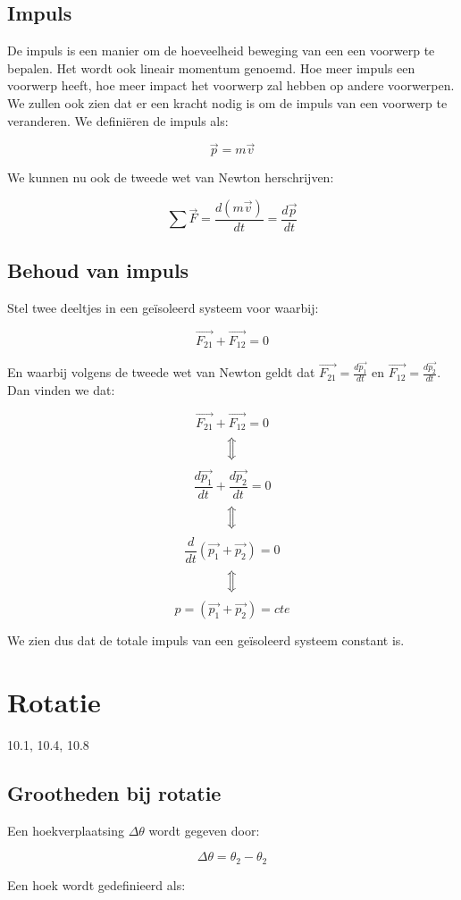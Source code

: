 \documentclass[12pt,a4paper]{article}
\newcommand{\Luda}{\Big\Updownarrow}
\begin{document}
    \subsection{Impuls}
    De impuls is een manier om de hoeveelheid beweging van een een voorwerp te
    bepalen. Het wordt ook lineair momentum genoemd. Hoe meer impuls een voorwerp
    heeft, hoe meer impact het voorwerp zal hebben op andere voorwerpen. We zullen
    ook zien dat er een kracht nodig is om de impuls van een voorwerp te veranderen. We
    definiëren de impuls als:
    
    $$\vec{p} = m\vec{v}$$
    
    We kunnen nu ook de tweede wet van Newton herschrijven:
    
    $$\sum \vec{F} = \frac{d(m\vec{v})}{dt} = \frac{d\vec{p}}{dt}$$

    \subsection{Behoud van impuls}
    Stel twee deeltjes in een geïsoleerd systeem voor waarbij:
    
    $$\vec{F_{21}} + \vec{F_{12}} = 0$$
    
    En waarbij volgens de tweede wet van Newton geldt dat $\vec{F_{21}} = \frac{d\vec{p_1}}{dt}$ en 
    $\vec{F_{12}} = \frac{d\vec{p_2}}{dt}$. Dan vinden we dat:
    
     $$\vec{F_{21}} + \vec{F_{12}} = 0$$
     $$\Luda$$
     $$\frac{d\vec{p_1}}{dt} + \frac{d\vec{p_2}}{dt} = 0$$
     $$\Luda$$
     $$\frac{d}{dt}(\vec{p_1} + \vec{p_2}) = 0$$
     $$\Luda$$
     $$p = (\vec{p_1} + \vec{p_2}) = cte$$

    We zien dus dat de totale impuls van een geïsoleerd systeem constant is. 

    \section{Rotatie}
    10.1, 10.4, 10.8
    
    \subsection{Grootheden bij rotatie}
    Een hoekverplaatsing $\Delta \theta$ wordt gegeven door:
    
    $$\Delta \theta = \theta_{2} - \theta_{2}$$
    
    Een hoek wordt gedefinieerd als:
    
\end{document}
